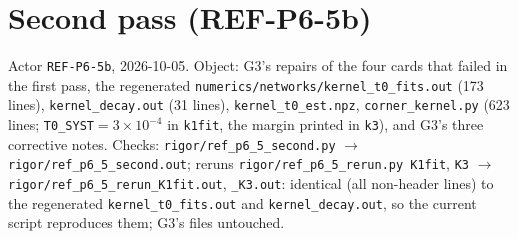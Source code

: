\documentclass[11pt]{article}
\begin{document}
\section{Second pass (REF-P6-5b)}
Actor \texttt{REF-P6-5b}, 2026-10-05. Object: G3's repairs of the four cards that failed in the first pass, the regenerated
\texttt{numerics/networks/kernel\_t0\_fits.out} (173 lines), \texttt{kernel\_decay.out} (31 lines), \texttt{kernel\_t0\_est.npz},
\texttt{corner\_kernel.py} (623 lines; \texttt{T0\_SYST}$=3\times10^{-4}$ in \texttt{k1fit}, the margin printed in \texttt{k3}),
and G3's three corrective notes. Checks: \texttt{rigor/ref\_p6\_5\_second.py} $\to$ \texttt{rigor/ref\_p6\_5\_second.out};
reruns \texttt{rigor/ref\_p6\_5\_rerun.py K1fit}, \texttt{K3} $\to$ \texttt{rigor/ref\_p6\_5\_rerun\_K1fit.out},
\texttt{\_K3.out}: identical (all non-header lines) to the regenerated \texttt{kernel\_t0\_fits.out} and \texttt{kernel\_decay.out},
so the current script reproduces them; G3's files untouched.
\end{document}
